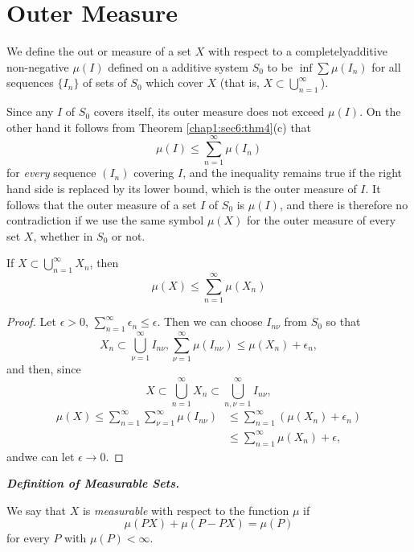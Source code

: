 \section{Outer Measure}\label{chap1:sec7}

We define the out or measure of a set $X$ with respect to a 
completely\pageoriginale additive non-negative $\mu(I)$ defined on a
additive system 
$S_0$ to be $\inf \sum \mu(I_n)$ for all sequences $\{I_n\}$ of sets of
$S_0$ which cover $X$ (that is, $X \subset
\bigcup\limits^{\infty}_{n=1}$). 

Since any $I$ of $S_0$ covers itself, its outer measure does not exceed
$\mu(I)$. On the other hand it follows from
Theorem \ref{chap1:sec6:thm4}(c) that   
$$ 
\mu (I) \leq \sum^{\infty}_{n=1} \mu (I_n) 
$$
for {\em every} sequence $(I_n)$ covering $I$, and the inequality remains true
if the right hand side is replaced by its lower bound, which is the
outer measure of $I$. It follows that the outer measure of a set $I$ of
$S_0$ is $\mu(I)$, and there is therefore no contradiction if we use
the same symbol $\mu (X)$ for the outer measure of every set $X$,
whether in $S_0$ or not. 

\begin{theorem}\label{chap1:sec7:thm5}%
  If $X\subset
  \bigcup\limits^{\infty}_{n=1} X_n$, then 
  $$
  \mu (X) \leq \sum^{\infty}_{n=1} \mu (X_n)
  $$
\end{theorem}

\begin{proof}
  Let $\epsilon > 0$,
  $\sum\limits^{\infty}_{n=1} \epsilon_n \leq \epsilon$. Then we
  can choose $I_{n\nu}$ from $S_0$ so that  
  $$
  X_n \subset \bigcup^{\infty}_{\nu=1} I_{n\nu},
  \sum^{\infty}_{\nu=1} \mu (I_{n\nu}) \leq \mu
  (X_n) + \epsilon_n,
  $$ 
  and then, since
  $$
  X \subset \bigcup^{\infty}_{n=1}
  X_n \subset \bigcup^{\infty}_{n,\nu=1}
  I_{n\nu}, 
  $$
  \begin{align*}
    \mu (X)\le \sum_{n=1}^{\infty} \sum_{\nu=1}^{\infty} \mu
    (I_{n\nu}) & \leq \sum_{n=1}^{\infty} (\mu (X_n)+\epsilon_n)\\ 
    &\leq \sum_{n=1}^{\infty}  \mu (X_n) + \epsilon, 
  \end{align*}
  and\pageoriginale we can let $\epsilon \rightarrow 0$.
\end{proof}

\medskip
\noindent\textit{\textbf{Definition of Measurable Sets.}}

We say that $X$ is {\em measurable} with respect to the function $\mu$
if
$$ 
\mu (PX)+ \mu (P-PX) = \mu (P) 
$$
for every $P$ with $\mu (P)< \infty$.

